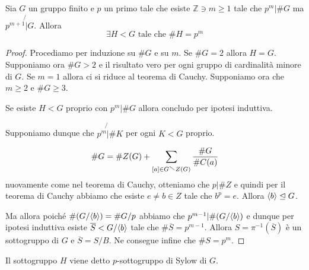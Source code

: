 \begin{theorem}
    Sia \(G\) un gruppo finito e \(p\) un primo tale che esiste \(\mathbb{Z} \ni
    m \ge 1\)  tale che \(p^{m} | \# G\) ma \(p^{m+1} \not{|} G\). Allora
    \[
        \exists H < G \text{ tale che } \# H = p^{m}
    \]
\end{theorem}
\begin{proof}
    Procediamo per induzione su \(\# G\) e su \(m\). Se \(\# G = 2\) allora \(H = G\).
    Supponiamo ora \(\#G > 2\) e il risultato vero per ogni gruppo di
    cardinalità minore di \(G\). Se \(m=1\) allora ci si riduce al teorema di
    Cauchy. Supponiamo ora che \(m \ge 2\) e \(\#G \ge 3\).

    Se esiste \(H < G\) proprio con \(p^{m} | \# G\) allora concludo per ipotesi
    induttiva.

    Supponiamo dunque che \(p^{m} \not{|} \# K\) per ogni \(K < G\) proprio.

    \[
        \# G = \# Z{(G)} + \sum_{[a] \in G\sminus Z{(G)}} \frac{\# G}{\# C{(a)}}
    \]
    nuovamente come nel teorema di Cauchy, otteniamo che \(p | \# Z\) e quindi
    per il teorema di Cauchy abbiamo che esiste \(e \neq b \in Z\) tale che
    \(b^{p} = e\). Allora \({\left\langle b\right\rangle} \trianglelefteq G\). 

    Ma allora poiché \(\# (G / {\left\langle b\right\rangle} ) = \# G / p\) abbiamo che \(p^{m-1} |
    \# {(G / {\left\langle b\right\rangle} )}\) e dunque per ipotesi induttiva esiste \(\overline{S}
    < G / {\left\langle b\right\rangle} \) tale che \(\# \overline{S} = p^{m-1}\). Allora \(S = \pi
    ^{-1}{(\overline{S})}\) è un sottogruppo di \(G\) e \(\overline{S} = S /
    B\). Ne consegue infine che \(\# S = p^{m}\).
\end{proof}
\begin{remark}
    Il sottogruppo \(H\) viene detto \(p\)-sottogruppo di Sylow di \(G\).
\end{remark}



